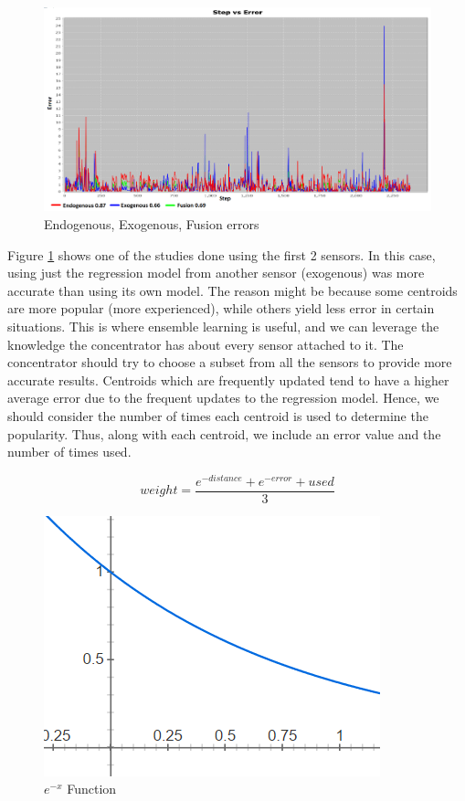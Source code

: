 \documentclass{mproj}
\begin{document}
\begin{figure}[H]
\caption{Endogenous, Exogenous, Fusion errors}
\label{fig:functionsErrors}
\centerline{\includegraphics[scale=0.4]{e1e2e3}}
\end{figure}

Figure \ref{fig:functionsErrors} shows one of the studies done using the first 2 sensors. In this case, using just the regression model from another sensor (exogenous) was more accurate than using its own model. The reason might be because some centroids are more popular (more experienced), while others yield less error in certain situations. This is where ensemble learning is useful, and we can leverage the knowledge the concentrator has about every sensor attached to it. The concentrator should try to choose a subset from all the sensors to provide more accurate results. Centroids which are frequently updated tend to have a higher average error due to the frequent updates to the regression model. Hence, we should consider the number of times each centroid is used to determine the popularity. Thus, along with each centroid, we include an error value and the number of times used.

\begin{equation}
\label{eq:ourEquation}
weight=\frac{e^{-distance} + e^{-error} + used}{3}
\end{equation}

\begin{figure}[H]
\caption{$e^{-x}$ Function}
\label{fig:e-x}
\centerline{\includegraphics[scale=0.6]{e-x}}
\end{figure}
\end{document}

